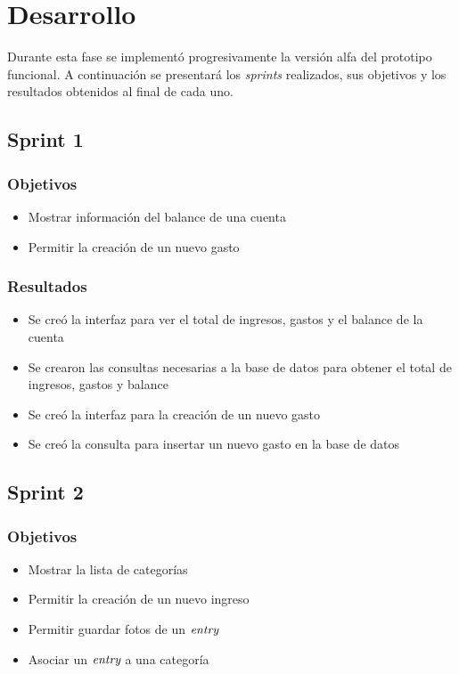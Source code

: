 \section{Desarrollo} \label{sect:desarrollo}

Durante esta fase se implementó progresivamente la versión alfa del prototipo funcional. A continuación se presentará los \textit{sprints} realizados, sus objetivos y los resultados obtenidos al final de cada uno.

\subsection{Sprint 1}

\subsubsection{Objetivos}
	\begin{itemize}
	\item Mostrar información del balance de una cuenta
	\item Permitir la creación de un nuevo gasto
	\end{itemize}

\subsubsection{Resultados}
\begin{itemize}
\item Se creó la interfaz para ver el total de ingresos, gastos y el balance de la cuenta
\item Se crearon las consultas necesarias a la base de datos para obtener el total de ingresos, gastos y balance
\item Se creó la interfaz para la creación de un nuevo gasto
\item Se creó la consulta para insertar un nuevo gasto en la base de datos
\end{itemize}

\subsection{Sprint 2}

\subsubsection{Objetivos}
\begin{itemize}
\item Mostrar la lista de categorías
\item Permitir la creación de un nuevo ingreso
\item Permitir guardar fotos de un $\textit{entry}$
\item Asociar un $\textit{entry}$ a una categoría
\end{itemize}

